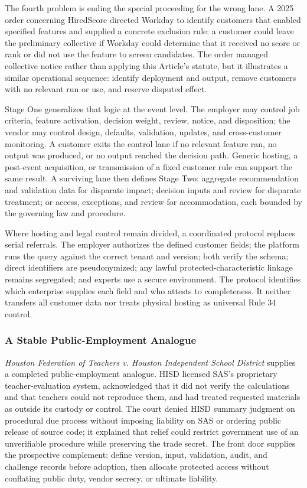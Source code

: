The fourth problem is ending the special proceeding for the wrong lane. A 2025 order concerning HiredScore directed Workday to identify customers that enabled specified features and supplied a concrete exclusion rule: a customer could leave the preliminary collective if Workday could determine that it received no score or rank or did not use the feature to screen candidates. The order managed collective notice rather than applying this Article's statute, but it illustrates a similar operational sequence: identify deployment and output, remove customers with no relevant run or use, and reserve disputed effect.

Stage One generalizes that logic at the event level. The employer may control job criteria, feature activation, decision weight, review, notice, and disposition; the vendor may control design, defaults, validation, updates, and cross-customer monitoring. A customer exits the control lane if no relevant feature ran, no output was produced, or no output reached the decision path. Generic hosting, a post-event acquisition, or transmission of a fixed customer rule can support the same result. A surviving lane then defines Stage Two: aggregate recommendation and validation data for disparate impact; decision inputs and review for disparate treatment; or access, exceptions, and review for accommodation, each bounded by the governing law and procedure.

Where hosting and legal control remain divided, a coordinated protocol replaces serial referrals. The employer authorizes the defined customer fields; the platform runs the query against the correct tenant and version; both verify the schema; direct identifiers are pseudonymized; any lawful protected-characteristic linkage remains segregated; and experts use a secure environment. The protocol identifies which enterprise supplies each field and who attests to completeness. It neither transfers all customer data nor treats physical hosting as universal Rule 34 control.

\subsubsection{A Stable Public-Employment Analogue}

\emph{Houston Federation of Teachers v. Houston Independent School District} supplies a completed public-employment analogue. HISD licensed SAS's proprietary teacher-evaluation system, acknowledged that it did not verify the calculations and that teachers could not reproduce them, and had treated requested materials as outside its custody or control. The court denied HISD summary judgment on procedural due process without imposing liability on SAS or ordering public release of source code; it explained that relief could restrict government use of an unverifiable procedure while preserving the trade secret. The front door supplies the prospective complement: define version, input, validation, audit, and challenge records before adoption, then allocate protected access without conflating public duty, vendor secrecy, or ultimate liability.
